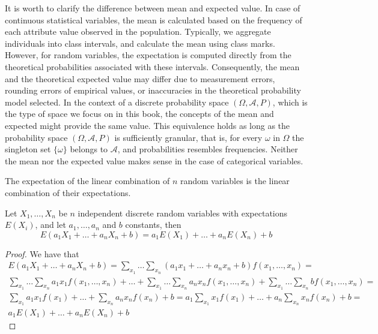 It is worth to clarify the difference between mean and expected value. In case of continuous statistical variables, the mean is calculated based on the frequency of each attribute value observed in the population. Typically, we aggregate individuals into class intervals, and calculate the mean using class marks. However, for random variables, the expectation is computed directly from the theoretical probabilities associated with these intervals. Consequently, the mean and the theoretical expected value may differ due to measurement errors, rounding errors of empirical values, or inaccuracies in the theoretical probability model selected. In the context of a discrete probability space $\left( \Omega, \mathcal{A}, P \right)$, which is the type of space we focus on in this book, the concepts of the mean and expected might provide the same value. This equivalence holds as long as the probability space $\left( \Omega, \mathcal{A}, P \right)$ is sufficiently granular, that is, for every $\omega$ in $\Omega$ the singleton set $\{ \omega \}$ belongs to $\mathcal{A}$, and probabilities resembles frequencies. Neither the mean nor the expected value makes sense in the case of categorical variables.

The expectation of the linear combination of $n$ random variables is the linear combination of their expectations.

\begin{proposition}
Let $X_{1}, \ldots, X_{n}$ be $n$ independent discrete random variables with expectations $E\left(X_{i}\right)$, and let $a_1, \ldots, a_n$ and $b$ constants, then
\[
E\left(a_{1}X_{1}+\ldots+a_{n}X_{n}+b\right)=a_{1}E\left(X_{1}\right)+\ldots+a_{n}E\left(X_{n}\right)+b
\]
\end{proposition}
\begin{proof}
We have that
\begin{multline}
E \left(a_1 X_1 + \ldots + a_n X_n +b \right) = 
\sum_{x_1} \ldots \sum_{x_n} \left(a_ 1 x_1 + \ldots + a_n x_n + b  \right) f\left(x_1, \ldots, x_n \right) = \\
\sum_{x_1} \ldots \sum_{x_n} a_1 x_1 f\left(x_1, \ldots, x_n \right) + \ldots + \sum_{x_1} \ldots \sum_{x_n} a_n x_n f\left(x_1, \ldots, x_n \right) + \sum_{x_1} \ldots \sum_{x_n} b f\left(x_1, \ldots, x_n \right) = \\
\sum_{x_1} a_1 x_1 f\left(x_1\right) + \ldots + \sum_{x_n} a_n x_n f\left( x_n \right) + b = 
a_1 \sum_{x_1} x_1 f\left(x_1\right) + \ldots + a_n \sum_{x_n} x_n f\left( x_n \right) + b = \\
a_1 E\left(X_1\right) + \ldots + a_n E\left(X_n\right) + b
\end{multline}
\end{proof}

